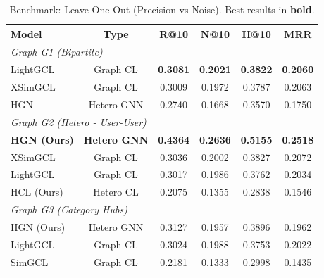 \documentclass[11pt]{article}
\begin{document}
\begin{table}[t]
  \centering
  \small
  \caption{Benchmark: Leave-One-Out (Precision vs Noise). Best results in \textbf{bold}.}
  \label{tab:results_loo}
  \begin{tabular}{l|c|cccc}
    \hline
    \textbf{Model}      & \textbf{Type}       & \textbf{R@10}   & \textbf{N@10}   & \textbf{H@10}   & \textbf{MRR}    \\
    \hline
    \multicolumn{6}{l}{\textit{Graph G1 (Bipartite)}}                                                                 \\
    LightGCL            & Graph CL            & \textbf{0.3081} & \textbf{0.2021} & \textbf{0.3822} & \textbf{0.2060} \\
    XSimGCL             & Graph CL            & 0.3009          & 0.1972          & 0.3787          & 0.2063          \\
    HGN                 & Hetero GNN          & 0.2740          & 0.1668          & 0.3570          & 0.1750          \\
    \hline
    \multicolumn{6}{l}{\textit{Graph G2 (Hetero - User-User)}}                                                        \\
    \textbf{HGN (Ours)} & \textbf{Hetero GNN} & \textbf{0.4364} & \textbf{0.2636} & \textbf{0.5155} & \textbf{0.2518} \\
    XSimGCL             & Graph CL            & 0.3036          & 0.2002          & 0.3827          & 0.2072          \\
    LightGCL            & Graph CL            & 0.3017          & 0.1986          & 0.3762          & 0.2034          \\
    HCL (Ours)          & Hetero CL           & 0.2075          & 0.1355          & 0.2838          & 0.1546          \\
    \hline
    \multicolumn{6}{l}{\textit{Graph G3 (Category Hubs)}}                                                             \\
    HGN (Ours)          & Hetero GNN          & 0.3127          & 0.1957          & 0.3896          & 0.1962          \\
    LightGCL            & Graph CL            & 0.3024          & 0.1988          & 0.3753          & 0.2022          \\
    SimGCL              & Graph CL            & 0.2181          & 0.1333          & 0.2998          & 0.1435          \\
    \hline
  \end{tabular}
\end{table}
\end{document}
